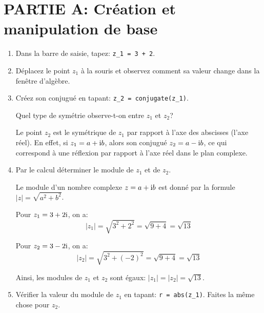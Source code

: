 \documentclass[11pt, a4paper]{report}
\begin{document}
\def\level{BTS}  %
\def\course{CIEL 1}
\def\chaptername{Nombes complexes} %
\def\docname{C112~--~TP1}        %

\pagestyle{DS_LP}

\NomPrenomNote{}


\section*{PARTIE A\@: Création et manipulation de base}
\medskip




\begin{enumerate}
    \item Dans la barre de saisie, tapez: \verb|z_1 = 3 + 2|.
    \item Déplacez le point $z_1$ à la souris et observez comment sa valeur change dans la fenêtre d'algèbre.
    \item Créez son conjugué en tapant: \verb|z_2 = conjugate(z_1)|.
    
    Quel type de symétrie observe-t-on entre $z_1$ et $z_2$?

    \begin{blocvisible}[height=2]
        Le point $z_2$ est le symétrique de $z_1$ par rapport à l'axe des abscisses (l'axe réel). En effet, si $z_1 = a + \mathrm {i} b$, alors son conjugué $z_2 = a - \mathrm {i} b$, ce qui correspond à une réflexion par rapport à l'axe réel dans le plan complexe.
    \end{blocvisible}    
    \item Par le calcul déterminer le module de $z_1$ et de $z_2$. 
    \begin{blocvisible}[height=4]
        Le module d'un nombre complexe $z = a + \mathrm {i} b$ est donné par la formule $|z| = \sqrt{a^2 + b^2}$. 

        Pour $z_1 = 3 + 2\mathrm {i}$, on a:
        \[|z_1| = \sqrt{3^2 + 2^2} = \sqrt{9 + 4} = \sqrt{13}\]

        Pour $z_2 = 3 - 2\mathrm {i}$, on a:
        \[|z_2| = \sqrt{3^2 + {(-2)}^2} = \sqrt{9 + 4} = \sqrt{13}\]

        Ainsi, les modules de $z_1$ et $z_2$ sont égaux: $|z_1| = |z_2| = \sqrt{13}$.
    \end{blocvisible}
    \item Vérifier la valeur du module de $z_1$ en tapant: \verb|r = abs(z_1)|. Faites la même chose pour $z_2$.

\end{enumerate}
\end{document}
